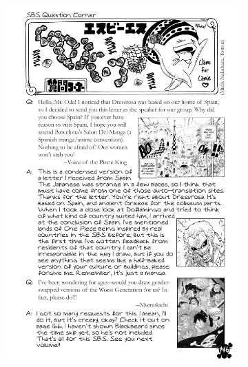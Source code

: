 \begin{figure}[htbp]
\begin{subfigure}[b]{0.25\textwidth}
    \end{subfigure}
    \hfill
    \begin{subfigure}[b]{0.25\textwidth}
        \includegraphics[width=\textwidth]{chapter/output/bw57.png}
        

\end{subfigure}
\end{figure}
